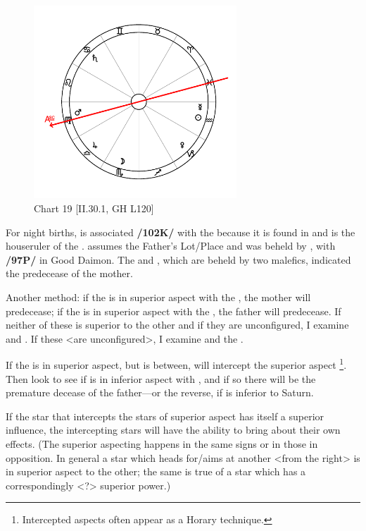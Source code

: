 \clearpage
\begin{figure}
\centering
\vspace{-20pt}
\includegraphics[width=0.68\textwidth]{charts/2_30_1}
\caption{Chart 19 [II.30.1, GH L120]}
\label{fig:chart19}
\end{figure}

For night births, \Saturn\xspace is associated \textbf{/102K/} with the \Moon\xspace because it is found in  and is the houseruler of the \Sun\xspace. \Saturn\xspace assumes the Father’s Lot/Place and was beheld by \Jupiter, with \Venus\xspace \textbf{/97P/} in Good Daimon. The \Moon\xspace and \Venus, which are beheld by two malefics, indicated the predecease of the mother.

Another method: if the \Sun\xspace is in superior aspect with the \Moon, the mother will predecease; if the \Moon\xspace is in superior aspect with the \Sun, the father will predecease. If neither of these is superior to the other and if they are unconfigured, I examine \Saturn\xspace and \Venus. If these <are unconfigured>, I examine \Saturn\xspace and the \Moon. 

If the \Sun\xspace is in superior aspect, but \Venus\xspace is between, \Venus\xspace will intercept the superior aspect
\footnote{Intercepted aspects often appear as a Horary technique.}. Then look to see if \Saturn\xspace is in inferior aspect with \Venus, and if so there will be the premature decease of the father—or the reverse, if \Venus\xspace is inferior to Saturn. 

If  the star that intercepts the stars of superior aspect has itself a superior influence, the intercepting stars will have the ability to bring about their own effects. (The superior aspecting happens in the same signs or in those in opposition. In general a star which heads for/aims at another <from the right> is in superior aspect to the other; the same
is true of a star which has a correspondingly <?> superior power.)

\newpage
